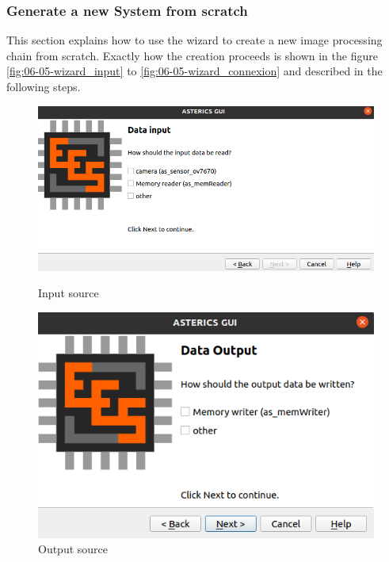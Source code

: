 	\subsubsection{Generate a new System from scratch}\label{subsub:06-05-new-system}
	This section explains how to use the wizard to create a new image processing chain from scratch.
	Exactly how the creation proceeds is shown in the figure \ref{fig:06-05-wizard_input} to \ref{fig:06-05-wizard_connexion} and described in the following steps.
	\begin{figure}[!ht]
		\centering
		\begin{minipage}{0.45\textwidth}
			\centering
			\includegraphics[width=\textwidth]{figs/gui/datainput}
			\caption{Input source}
			\label{fig:06-05-wizard_input}
		\end{minipage} 
		\hfill
		\begin{minipage}{0.45\textwidth}
			\centering
			\includegraphics[width=\textwidth,]{figs/gui/dataoutput}
			\caption{Output source}
			\label{fig:06-05-wizard_output}
		\end{minipage}
		\begin{minipage}{0.45\textwidth}

\end{minipage}
\end{figure}
